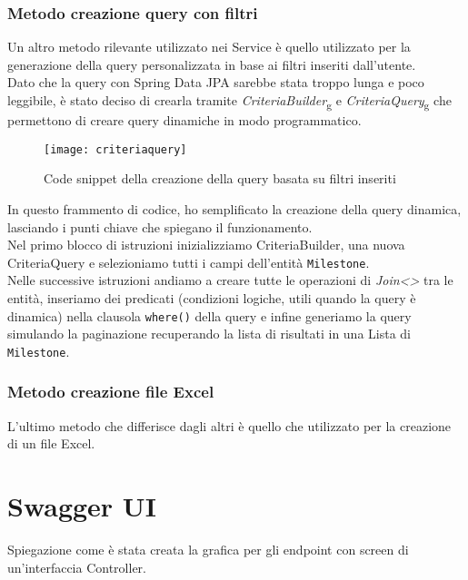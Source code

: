 \subsubsection{Metodo creazione query con filtri}
Un altro metodo rilevante utilizzato nei Service è quello utilizzato per la generazione della query personalizzata in base ai filtri inseriti dall'utente.\\
Dato che la query con Spring Data JPA sarebbe stata troppo lunga e poco leggibile, è stato deciso di crearla tramite \textit{CriteriaBuilder}\textsubscript{g} e \textit{CriteriaQuery}\textsubscript{g} che permettono di creare query dinamiche in modo programmatico.
\begin{figure}[H] 
    \centering 
    \texttt{[image: criteriaquery]} 
    \caption{Code snippet della creazione della query basata su filtri inseriti}
\end{figure}
\noindent In questo frammento di codice, ho semplificato la creazione della query dinamica, lasciando i punti chiave che spiegano il funzionamento.\\
Nel primo blocco di istruzioni inizializziamo CriteriaBuilder, una nuova CriteriaQuery e selezioniamo tutti i campi dell'entità \texttt{Milestone}.\\
Nelle successive istruzioni andiamo a creare tutte le operazioni di \textit{Join<>} tra le entità, inseriamo dei predicati (condizioni logiche, utili quando la query è dinamica) nella clausola \texttt{where()} della query e infine generiamo la query simulando la paginazione recuperando la lista di risultati in una Lista di \texttt{Milestone}.

\subsubsection{Metodo creazione file Excel}
L'ultimo metodo che differisce dagli altri è quello che utilizzato per la creazione di un file Excel.


\section{Swagger UI}
Spiegazione come è stata creata la grafica per gli endpoint con screen di un'interfaccia Controller.